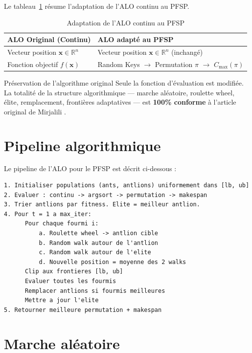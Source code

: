 \documentclass[12pt,a4paper,twoside]{report}
\begin{document}
Le tableau~\ref{tab:adaptation} résume l'adaptation de l'ALO continu au PFSP.

\begin{table}[H]
\centering
{}
\caption{Adaptation de l'ALO continu au PFSP}
\label{tab:adaptation}
\begin{tabular}{>{\raggedright\arraybackslash}p{5cm} >{\raggedright\arraybackslash}p{8cm}}
\toprule
\rowcolor{TableHeader}
\color{white}ALO Original (Continu) & \color{white}ALO adapté au PFSP \\
\midrule
Vecteur position $\mathbf{x} \in \mathbb{R}^n$ & Vecteur position $\mathbf{x} \in \mathbb{R}^n$ (inchangé) \\
Fonction objectif $f(\mathbf{x})$ & Random Keys $\rightarrow$ Permutation $\pi$ $\rightarrow$ $C_{\max}(\pi)$ \\
\bottomrule
\end{tabular}
\end{table}

\begin{infobox}{Préservation de l'algorithme original}
Seule la fonction d'évaluation est modifiée. La totalité de la structure algorithmique --- marche aléatoire, roulette wheel, élite, remplacement, frontières adaptatives --- est \textbf{100\% conforme} à l'article original de Mirjalili \cite{mirjalili2015}.
\end{infobox}

\section{Pipeline algorithmique}

Le pipeline de l'ALO pour le PFSP est décrit ci-dessous :

\begin{lstlisting}
1. Initialiser populations (ants, antlions) uniformement dans [lb, ub]
2. Evaluer : continu -> argsort -> permutation -> makespan
3. Trier antlions par fitness. Elite = meilleur antlion.
4. Pour t = 1 a max_iter:
      Pour chaque fourmi i:
          a. Roulette wheel -> antlion cible
          b. Random walk autour de l'antlion
          c. Random walk autour de l'elite
          d. Nouvelle position = moyenne des 2 walks
      Clip aux frontieres [lb, ub]
      Evaluer toutes les fourmis
      Remplacer antlions si fourmis meilleures
      Mettre a jour l'elite
5. Retourner meilleure permutation + makespan
\end{lstlisting}

\section{Marche aléatoire}
\end{document}
